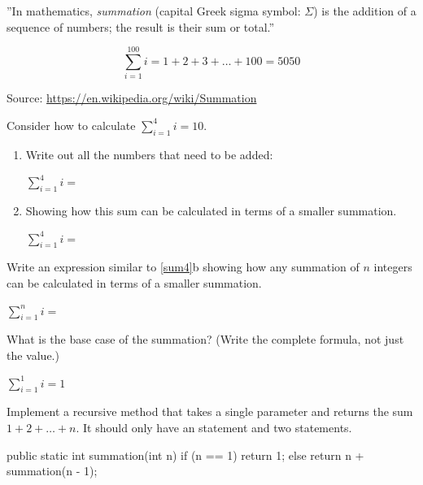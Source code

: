 

''In mathematics, \emph{summation} (capital Greek sigma symbol: $\Sigma$) is the addition of a sequence of numbers; the result is their sum or total.''

$$ \sum_{i=1}^{100} i = 1 + 2 + 3 + \ldots + 100 = 5050 $$

\smallskip\hfill
Source: \url{https://en.wikipedia.org/wiki/Summation}




\Q \label{sum4} Consider how to calculate $\sum\limits_{i=1}^{4} i = 10$.

\begin{enumerate}
\item Write out all the numbers that need to be added:

$\sum\limits_{i=1}^{4} i =$ 

\item Showing how this sum can be calculated in terms of a smaller summation.

$\sum\limits_{i=1}^{4} i =$ 
\end{enumerate}


\Q \label{sumn} Write an expression similar to \ref{sum4}b showing how any summation of $n$ integers can be calculated in terms of a smaller summation.

\begin{center}
$\sum\limits_{i=1}^{n} i =$ 
\end{center}


\Q What is the base case of the summation? (Write the complete formula, not just the value.)

\begin{answer}
$\sum\limits_{i=1}^{1} i = 1$
\end{answer}


\Q Implement a recursive method  that takes a single parameter  and returns the sum $1 + 2 + \ldots + n$.
It should only have an  statement and two  statements.

\vspace{-1ex}
\begin{answer}[10em]
\begin{javaans}
public static int summation(int n) {
    if (n == 1) {
        return 1;
    } else {
        return n + summation(n - 1);
    }
}
\end{javaans}
\end{answer}


